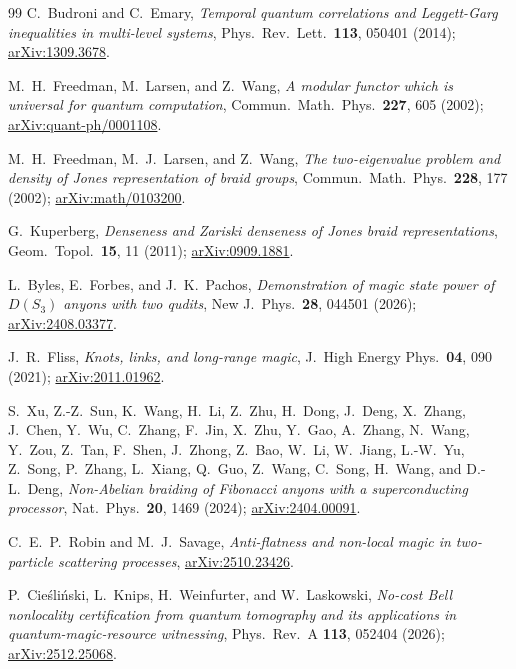 \documentclass[aps,pra,twocolumn,superscriptaddress,longbibliography,floatfix,nofootinbib]{revtex4-2}
\begin{document}
\begin{thebibliography}{99}
C.~Budroni and C.~Emary,
\emph{Temporal quantum correlations and Leggett-Garg inequalities in
multi-level systems},
Phys.\ Rev.\ Lett.\ \textbf{113}, 050401 (2014);
\href{https://arxiv.org/abs/1309.3678}{arXiv:1309.3678}.

M.~H.~Freedman, M.~Larsen, and Z.~Wang,
\emph{A modular functor which is universal for quantum computation},
Commun.\ Math.\ Phys.\ \textbf{227}, 605 (2002);
\href{https://arxiv.org/abs/quant-ph/0001108}{arXiv:quant-ph/0001108}.

M.~H.~Freedman, M.~J.~Larsen, and Z.~Wang,
\emph{The two-eigenvalue problem and density of Jones representation
of braid groups},
Commun.\ Math.\ Phys.\ \textbf{228}, 177 (2002);
\href{https://arxiv.org/abs/math/0103200}{arXiv:math/0103200}.

G.~Kuperberg,
\emph{Denseness and Zariski denseness of Jones braid representations},
Geom.\ Topol.\ \textbf{15}, 11 (2011);
\href{https://arxiv.org/abs/0909.1881}{arXiv:0909.1881}.

L.~Byles, E.~Forbes, and J.~K.~Pachos,
\emph{Demonstration of magic state power of $D(S_3)$ anyons with two
qudits},
New J.\ Phys.\ \textbf{28}, 044501 (2026);
\href{https://arxiv.org/abs/2408.03377}{arXiv:2408.03377}.

J.~R.~Fliss,
\emph{Knots, links, and long-range magic},
J.\ High Energy Phys.\ \textbf{04}, 090 (2021);
\href{https://arxiv.org/abs/2011.01962}{arXiv:2011.01962}.

S.~Xu, Z.-Z.~Sun, K.~Wang, H.~Li, Z.~Zhu, H.~Dong, J.~Deng, X.~Zhang, J.~Chen,
Y.~Wu, C.~Zhang, F.~Jin, X.~Zhu, Y.~Gao, A.~Zhang, N.~Wang, Y.~Zou, Z.~Tan,
F.~Shen, J.~Zhong, Z.~Bao, W.~Li, W.~Jiang, L.-W.~Yu, Z.~Song, P.~Zhang,
L.~Xiang, Q.~Guo, Z.~Wang, C.~Song, H.~Wang, and D.-L.~Deng,
\emph{Non-Abelian braiding of Fibonacci anyons with a superconducting
processor},
Nat.\ Phys.\ \textbf{20}, 1469 (2024);
\href{https://arxiv.org/abs/2404.00091}{arXiv:2404.00091}.

C.~E.~P.~Robin and M.~J.~Savage,
\emph{Anti-flatness and non-local magic in two-particle scattering
processes},
\href{https://arxiv.org/abs/2510.23426}{arXiv:2510.23426}.

P.~Cie\'sli\'nski, L.~Knips, H.~Weinfurter, and W.~Laskowski,
\emph{No-cost Bell nonlocality certification from quantum tomography
and its applications in quantum-magic-resource witnessing},
Phys.\ Rev.\ A \textbf{113}, 052404 (2026);
\href{https://arxiv.org/abs/2512.25068}{arXiv:2512.25068}.


\end{thebibliography}
\end{document}
